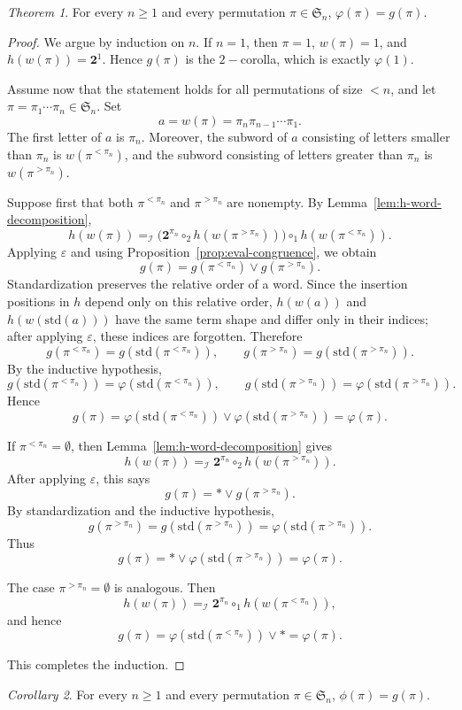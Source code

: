 \documentclass[a4paper]{article}
\theoremstyle{plain}
\theoremstyle{definition}
\theoremstyle{remark}
\numberwithin{equation}{section}
\newcommand{\Sym}{\mathfrak{S}}
\newcommand{\std}{\mathrm{std}}
\newcommand{\eval}{\varepsilon}
\newtheorem{theorem}{Theorem}[section]
\newtheorem{corollary}[theorem]{Corollary}
\begin{document}
\begin{theorem}\label{thm:varphi-via-h}
For every \(n\ge 1\) and every permutation \(\pi\in\Sym_n\), $\varphi(\pi)=g(\pi)$.
\end{theorem}

\begin{proof}
We argue by induction on \(n\). If \(n=1\), then \(\pi=1\), \(w(\pi)=1\), and
\(h(w(\pi))=\mathbf 2^1\). Hence \(g(\pi)\) is the $2-$corolla, which is
exactly \(\varphi(1)\).

Assume now that the statement holds for all permutations of size \(<n\), and let $\pi=\pi_1\cdots\pi_n\in\Sym_n$. Set
\[
a=w(\pi)=\pi_n\pi_{n-1}\cdots\pi_1.
\]
The first letter of \(a\) is \(\pi_n\). Moreover, the subword of \(a\) consisting
of letters smaller than \(\pi_n\) is \(w(\pi^{<\pi_n})\), and the subword
consisting of letters greater than \(\pi_n\) is \(w(\pi^{>\pi_n})\).

Suppose first that both \(\pi^{<\pi_n}\) and \(\pi^{>\pi_n}\) are nonempty. By
Lemma~\ref{lem:h-word-decomposition},
\[
h(w(\pi))
=_{\mathcal I}
\bigl(\mathbf 2^{\pi_n}\circ_2 h(w(\pi^{>\pi_n}))\bigr)
\circ_1 h(w(\pi^{<\pi_n})).
\]
Applying \(\eval\) and using Proposition~\ref{prop:eval-congruence}, we obtain
\[
g(\pi)
=
g(\pi^{<\pi_n})\vee g(\pi^{>\pi_n}).
\]
Standardization preserves the relative order of a word. Since the insertion
positions in \(h\) depend only on this relative order, \(h(w(a))\) and
\(h(w(\std(a)))\) have the same term shape and differ only in their
indices; after applying \(\eval\), these indices are forgotten.
Therefore
\[
g(\pi^{<\pi_n})=g(\std(\pi^{<\pi_n})),
\qquad
g(\pi^{>\pi_n})=g(\std(\pi^{>\pi_n})).
\]
By the inductive hypothesis,
\[
g(\std(\pi^{<\pi_n}))
=
\varphi(\std(\pi^{<\pi_n})),
\qquad
g(\std(\pi^{>\pi_n}))
=
\varphi(\std(\pi^{>\pi_n})).
\]
Hence
\[
g(\pi)
=
\varphi(\std(\pi^{<\pi_n}))\vee
\varphi(\std(\pi^{>\pi_n}))
=
\varphi(\pi).
\]

If \(\pi^{<\pi_n}=\emptyset\), then Lemma~\ref{lem:h-word-decomposition} gives
\[
h(w(\pi))
=_{\mathcal I}
\mathbf 2^{\pi_n}\circ_2 h(w(\pi^{>\pi_n})).
\]
After applying \(\eval\), this says
\[
g(\pi)=\ast\vee g(\pi^{>\pi_n}).
\]
By standardization and the inductive hypothesis,
\[
g(\pi^{>\pi_n})
=
g(\std(\pi^{>\pi_n}))
=
\varphi(\std(\pi^{>\pi_n})).
\]
Thus
\[
g(\pi)
=
\ast\vee\varphi(\std(\pi^{>\pi_n}))
=
\varphi(\pi).
\]

The case \(\pi^{>\pi_n}=\emptyset\) is analogous. Then
\[
h(w(\pi))
=_{\mathcal I}
\mathbf 2^{\pi_n}\circ_1 h(w(\pi^{<\pi_n})),
\]
and hence
\[
g(\pi)
=
\varphi(\std(\pi^{<\pi_n}))\vee\ast
=
\varphi(\pi).
\]

This completes the induction.
\end{proof}
\begin{corollary}\label{cor:phi-via-h}
For every \(n\ge 1\) and every permutation \(\pi\in\Sym_n\), $\phi(\pi)=g(\pi)$.
\end{corollary}
\end{document}
